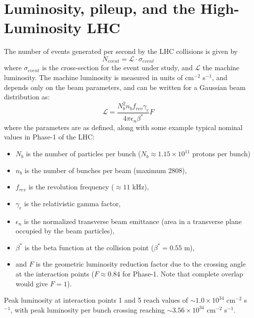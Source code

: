 \section{Luminosity, pileup, and the High-Luminosity LHC}
The number of events generated per second by the LHC collisions is given by
\begin{equation}
     N_{event} = \mathcal{L} \cdot \sigma_{event}
    \label{eqn:nEvents}
\end{equation} 
where $\sigma_{event}$ is the cross-section for the event under study, and $\mathcal{L}$ the machine luminosity. The machine luminosity is measured in units of cm$^{-2}$ s$^{-1}$, and depends only on the beam parameters, and can be written for a Gaussian beam distribution as:
\begin{equation}
    \mathcal{L} = \frac{N_b^2 n_b f_{rev} \gamma_r}{4\pi \epsilon_n \beta^*} F
\end{equation}
where the parameters are as defined, along with some example typical nominal values in Phase-1 of the LHC:
\begin{itemize}
    \item $N_b$ is the number of particles per bunch ($N_b \approx 1.15 \times 10^{11}$ protons per bunch)
    \item $n_b$ is the number of bunches per beam (maximum 2808),
    \item $f_{rev}$ is the revolution frequency ($\approx 11$ kHz),
    \item $\gamma_r$ is the relativistic gamma factor,
    \item $\epsilon_n$ is the normalized transverse beam emittance (area in a transverse plane occupied by the beam particles),
    \item $\beta^*$ is the beta function at the collision point ($\beta^* = 0.55$ m),
    \item and $F$ is the geometric luminosity reduction factor due to the crossing angle at the interaction points ($F \approx 0.84$ for Phase-1. Note that complete overlap would give $F = 1$).
\end{itemize}
Peak luminosity at interaction points 1 and 5 reach values of $\sim 1.0 \times 10^{34}$ cm$^{-2}$ s$^{-1}$, with peak luminosity per bunch crossing reaching $\sim 3.56 \times 10^{34}$ cm$^{-2}$ s$^{-1}$.

